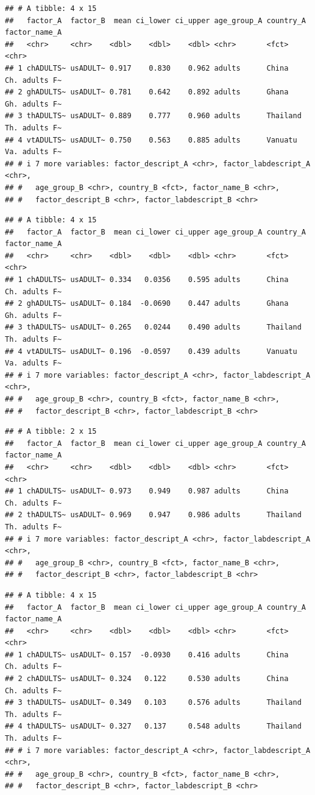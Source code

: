 \documentclass[
  man]{apa6}
\begin{document}
\begin{verbatim}
## # A tibble: 4 x 15
##   factor_A  factor_B  mean ci_lower ci_upper age_group_A country_A factor_name_A
##   <chr>     <chr>    <dbl>    <dbl>    <dbl> <chr>       <fct>     <chr>        
## 1 chADULTS~ usADULT~ 0.917    0.830    0.962 adults      China     Ch. adults F~
## 2 ghADULTS~ usADULT~ 0.781    0.642    0.892 adults      Ghana     Gh. adults F~
## 3 thADULTS~ usADULT~ 0.889    0.777    0.960 adults      Thailand  Th. adults F~
## 4 vtADULTS~ usADULT~ 0.750    0.563    0.885 adults      Vanuatu   Va. adults F~
## # i 7 more variables: factor_descript_A <chr>, factor_labdescript_A <chr>,
## #   age_group_B <chr>, country_B <fct>, factor_name_B <chr>,
## #   factor_descript_B <chr>, factor_labdescript_B <chr>
\end{verbatim}

\begin{verbatim}
## # A tibble: 4 x 15
##   factor_A  factor_B  mean ci_lower ci_upper age_group_A country_A factor_name_A
##   <chr>     <chr>    <dbl>    <dbl>    <dbl> <chr>       <fct>     <chr>        
## 1 chADULTS~ usADULT~ 0.334   0.0356    0.595 adults      China     Ch. adults F~
## 2 ghADULTS~ usADULT~ 0.184  -0.0690    0.447 adults      Ghana     Gh. adults F~
## 3 thADULTS~ usADULT~ 0.265   0.0244    0.490 adults      Thailand  Th. adults F~
## 4 vtADULTS~ usADULT~ 0.196  -0.0597    0.439 adults      Vanuatu   Va. adults F~
## # i 7 more variables: factor_descript_A <chr>, factor_labdescript_A <chr>,
## #   age_group_B <chr>, country_B <fct>, factor_name_B <chr>,
## #   factor_descript_B <chr>, factor_labdescript_B <chr>
\end{verbatim}

\begin{verbatim}
## # A tibble: 2 x 15
##   factor_A  factor_B  mean ci_lower ci_upper age_group_A country_A factor_name_A
##   <chr>     <chr>    <dbl>    <dbl>    <dbl> <chr>       <fct>     <chr>        
## 1 chADULTS~ usADULT~ 0.973    0.949    0.987 adults      China     Ch. adults F~
## 2 thADULTS~ usADULT~ 0.969    0.947    0.986 adults      Thailand  Th. adults F~
## # i 7 more variables: factor_descript_A <chr>, factor_labdescript_A <chr>,
## #   age_group_B <chr>, country_B <fct>, factor_name_B <chr>,
## #   factor_descript_B <chr>, factor_labdescript_B <chr>
\end{verbatim}

\begin{verbatim}
## # A tibble: 4 x 15
##   factor_A  factor_B  mean ci_lower ci_upper age_group_A country_A factor_name_A
##   <chr>     <chr>    <dbl>    <dbl>    <dbl> <chr>       <fct>     <chr>        
## 1 chADULTS~ usADULT~ 0.157  -0.0930    0.416 adults      China     Ch. adults F~
## 2 chADULTS~ usADULT~ 0.324   0.122     0.530 adults      China     Ch. adults F~
## 3 thADULTS~ usADULT~ 0.349   0.103     0.576 adults      Thailand  Th. adults F~
## 4 thADULTS~ usADULT~ 0.327   0.137     0.548 adults      Thailand  Th. adults F~
## # i 7 more variables: factor_descript_A <chr>, factor_labdescript_A <chr>,
## #   age_group_B <chr>, country_B <fct>, factor_name_B <chr>,
## #   factor_descript_B <chr>, factor_labdescript_B <chr>
\end{verbatim}
\end{document}
